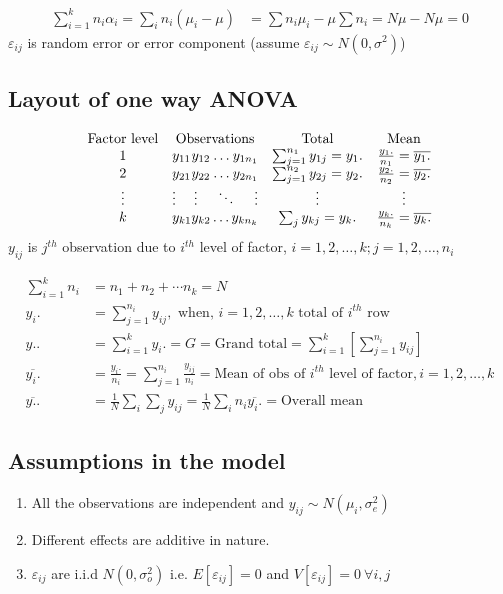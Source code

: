 \documentclass[oneside,11pt,pdftex]{book}%
\numberwithin{equation}{section}
\numberwithin{section}{chapter}
\numberwithin{equation}{chapter}
\begin{document}
 
 \begin{align*}
  \sum_{i=1}^k n_i \alpha_i = \sum_{i} n_i (\mu_i-\mu) &= \sum n_i\mu_i - \mu \sum n_i =N\mu-N\mu= 0
 \end{align*}
 $ \varepsilon_{ij}$ is random error or error component (assume $ \varepsilon_{ij} \sim N(0, \sigma^2) $)

\subsection{Layout of one way ANOVA}
\[
\begin{matrix} 
	\text{Factor level} & \text{Observations} & \text{Total} & \text{Mean} \\
	1 & y_{11} \hfill y_{12} \hfill \dots \hfill y_{1n_1} & \sum_{j=1}^{n_1}y_{1j}=y_1. & \frac{y_1.}{n_1}=\overline{y_{1}.}\\
	2 & y_{21} \hfill y_{22} \hfill \dots \hfill y_{2n_1} & \sum_{j=1}^{n_2}y_{2j}=y_2. & \frac{y_2.}{n_2}=\overline{y_{2}.}\\
	\vdots & \vdots \hfill \vdots \hfill \ddots \hfill \vdots & \vdots & \vdots \\
	k & y_{k1} \hfill y_{k2} \hfill \dots \hfill y_{kn_{k}} & \sum_j y_{kj}=y_k. & \frac{y_k .}{n_k}=\overline{y_{k}.}
\end{matrix}
\]
$ y_{ij} $ is $ j^{th} $ observation due to $ i^{th} $ level of factor, $ i=1,2,\dots, k; j=1,2,\dots,n_i $

\begin{align*}
	\sum_{i=1}^k n_i&=n_1+n_2+\cdots n_k = N\\
	y_i.&= \sum_{j=1}^{n_i} y_{ij}, \text{ when, } i=1,2,\dots,k \text{ total of $i^{th}$ row}\\
	y..&= \sum_{i=1}^{k} y_i. = G = \text{Grand total}= \sum_{i=1}^k \left[ \sum_{j=1}^{n_i} y_{ij} \right]\\
	\overline{y_i.}&= \frac{y_i.}{n_i}=\sum_{j=1}^{n_i}\frac{y_{ij}}{n_i}= \text{Mean of obs of $i^{th}$ level of factor}, i=1,2, \dots, k\\
	\overline{y..}&=\frac{1}{N}\sum_i \sum_j y_{ij}=\frac{1}{N} \sum_i n_i \overline{y_i.}=\text{Overall mean}
\end{align*}

\subsection{Assumptions in the model}
\begin{enumerate}
	\item All the observations are independent and $ y_{ij} \sim N(\mu_i, \sigma_e ^2) $
	\item Different effects are additive in nature.
	\item $ \varepsilon_{ij} $ are i.i.d $ N(0, \sigma_o^2) $ i.e. $ E[\varepsilon_{ij}] =0$ and $ V[\varepsilon_{ij}] =0\ \forall i, j$
\end{enumerate}
\end{document}
